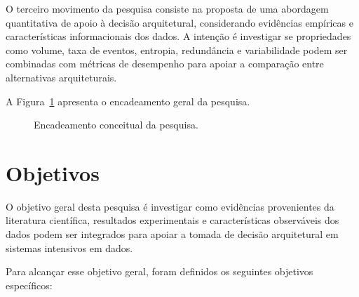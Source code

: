 O terceiro movimento da pesquisa consiste na proposta de uma abordagem quantitativa de apoio à decisão arquitetural, considerando evidências empíricas e características informacionais dos dados. A intenção é investigar se propriedades como volume, taxa de eventos, entropia, redundância e variabilidade podem ser combinadas com métricas de desempenho para apoiar a comparação entre alternativas arquiteturais.


A Figura~\ref{fig:fluxo-pesquisa} apresenta o encadeamento geral da pesquisa.

\begin{figure}[htbp]
\centering
{}
\caption{Encadeamento conceitual da pesquisa.}
\label{fig:fluxo-pesquisa}
\end{figure}

\section{Objetivos}
\label{sec:intro-objetivos}

O objetivo geral desta pesquisa é investigar como evidências provenientes da literatura científica, resultados experimentais e características observáveis dos dados podem ser integrados para apoiar a tomada de decisão arquitetural em sistemas intensivos em dados.

Para alcançar esse objetivo geral, foram definidos os seguintes objetivos específicos:

